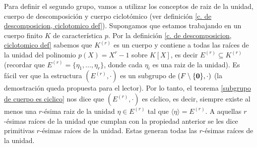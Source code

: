 	Para definir el segundo grupo, vamos a utilizar los conceptos de raiz de la unidad, cuerpo de descomposición y cuerpo ciclotómico (ver definición \ref{c. de descomposicion, ciclotomico def}).
Supongamos que estamos trabajando en un cuerpo finito $K$ de caracterí­stica $p$. Por la definición \ref{c. de descomposicion, ciclotomico def} sabemos que $K^{(r)}$ es un cuerpo y contiene a todas las raíces de la unidad del polinomio $p(X)=X^r-1$ sobre $K[X]$, es decir $E^{(r)}\subseteq K^{(r)}$ (recordar que $E^{(r)}=\{\eta_1,...,\eta_r\}$, donde cada $\eta_i$ es una raiz de la unidad).
Es fácil ver que la estructura $(E^{(r)},\cdot)$ es un subgrupo de $(F\setminus \{\mathbf{0}\},\cdot)$ (la demostración queda propuesta para el lector). Por lo tanto, el teorema \ref{subgrupo de cuerpo es ciclico} nos dice que $(E^{(r)},\cdot)$ es cíclico, es decir, siempre existe al menos una $r$-ésima raiz de la unidad $\eta\in E^{(r)}$ tal que $\langle\eta\rangle = E^{(r)}$. A aquellas $r$-ésimas raíces de la unidad que cumplan con la propiedad anterior se les dice primitivas $r$-ésimas raíces de la unidad. Estas generan todas las $r$-ésimas raíces de la unidad.
